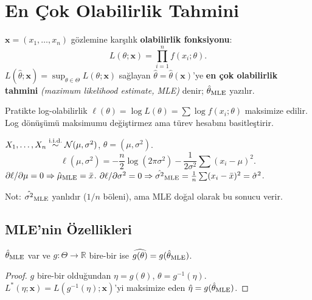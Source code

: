 \section{En Çok Olabilirlik Tahmini}
\label{sec:mle}

\begin{tanim}\label{def:mle}
$\mathbf{x} = (x_1,\ldots,x_n)$ gözlemine karşılık \textbf{olabilirlik fonksiyonu}:
\[
  L(\theta;\mathbf{x}) = \prod_{i=1}^n f(x_i;\theta).
\]
$L(\hat{\theta};\mathbf{x}) = \sup_{\theta\in\Theta} L(\theta;\mathbf{x})$ sağlayan $\hat{\theta} = \hat{\theta}(\mathbf{x})$'ye \textbf{en çok olabilirlik tahmini} \emph{(maximum likelihood estimate, MLE)} denir; $\hat{\theta}_{\text{MLE}}$ yazılır.
\end{tanim}

\begin{tanimgerekce}
Pratikte log-olabilirlik $\ell(\theta) = \log L(\theta) = \sum\log f(x_i;\theta)$ maksimize edilir. Log dönüşümü maksimumu değiştirmez ama türev hesabını basitleştirir.
\end{tanimgerekce}

\begin{ornek}\label{ex:normal_mle}
$X_1,\ldots,X_n\overset{\text{i.i.d.}}{\sim}\mathcal{N}(\mu,\sigma^2)$, $\theta=(\mu,\sigma^2)$.
\[
  \ell(\mu,\sigma^2) = -\frac{n}{2}\log(2\pi\sigma^2) - \frac{1}{2\sigma^2}\sum(x_i-\mu)^2.
\]
$\partial\ell/\partial\mu = 0 \Rightarrow \hat{\mu}_{\text{MLE}}=\bar{x}$.
$\partial\ell/\partial\sigma^2 = 0 \Rightarrow \hat{\sigma^2}_{\text{MLE}} = \frac{1}{n}\sum(x_i-\bar{x})^2 = \hat{\sigma}^2$.

Not: $\hat{\sigma^2}_{\text{MLE}}$ yanlıdır ($1/n$ böleni), ama MLE doğal olarak bu sonucu verir.
\end{ornek}

\subsection{MLE'nin Özellikleri}

\begin{teorem}[İnvaryant]\label{thm:mle_invaryant}
$\hat{\theta}_{\text{MLE}}$ var ve $g:\Theta\to\mathbb{R}$ bire-bir ise $\widehat{g(\theta)} = g(\hat{\theta}_{\text{MLE}})$.
\end{teorem}

\begin{proof}
$g$ bire-bir olduğundan $\eta=g(\theta)$, $\theta=g^{-1}(\eta)$. $L^*(\eta;\mathbf{x}) = L(g^{-1}(\eta);\mathbf{x})$'yi maksimize eden $\hat\eta = g(\hat{\theta}_{\text{MLE}})$.
\end{proof}

